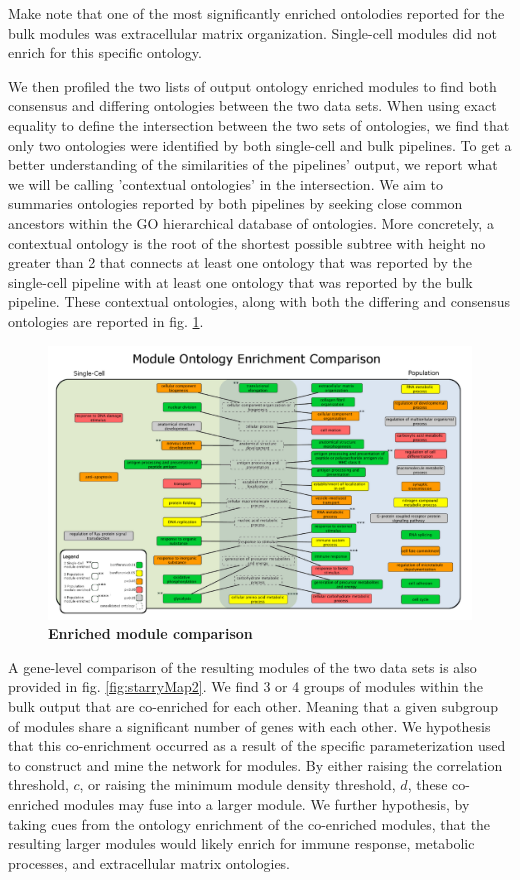 \documentclass[10pt,letterpaper]{article}
\begin{document}
Make note that one of the most significantly enriched ontolodies reported for the bulk modules was extracellular matrix organization. Single-cell modules did not enrich for this specific ontology. 

We then profiled the two lists of output ontology enriched modules to find both consensus and differing ontologies between the two data sets. When using exact equality to define the intersection between the two sets of ontologies, we find that only two ontologies were identified by both single-cell and bulk pipelines. To get a better understanding of the similarities of the pipelines' output, we report what we will be calling 'contextual ontologies' in the intersection. We aim to summaries ontologies reported by both pipelines by seeking close common ancestors within the GO hierarchical database of ontologies. More concretely, a contextual ontology is the root of the shortest possible subtree with height no greater than 2 that connects at least one ontology that was reported by the single-cell pipeline with at least one ontology that was reported by the bulk pipeline. These contextual ontologies, along with both the differing and consensus ontologies are reported in fig. \ref{fig:venn}.

\begin{figure}
\centering
\includegraphics[width=180mm]{Figures/PopVsSCToCytoscape}
\caption{\textbf{Enriched module comparison}}
\label{fig:venn}
\end{figure}

A gene-level comparison of the resulting modules of the two data sets is also provided in fig. \ref{fig:starryMap2}. We find 3 or 4 groups of modules within the bulk output that are co-enriched for each other. Meaning that a given subgroup of modules share a significant number of genes with each other. We hypothesis that this co-enrichment occurred as a result of the specific parameterization used to construct and mine the network for modules. By either raising the correlation threshold, $c$, or raising the minimum module density threshold, $d$, these co-enriched modules may fuse into a larger module. We further hypothesis, by taking cues from the ontology enrichment of the co-enriched modules, that the resulting larger modules would likely enrich for immune response, metabolic processes, and extracellular matrix ontologies. 
\end{document}
